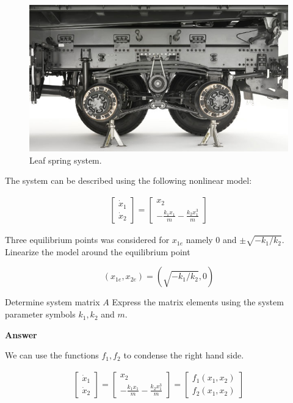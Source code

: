 \begin{figure}[!htb]
\begin{center}
\includegraphics[scale=0.280]{img/state_feedback/Image_LeafSpringSuspension_01.jpg}
\end{center}
\caption{Leaf spring system.}
\label{Image_LeafSpringSuspension_01}
\end{figure}

The system can be described using the following nonlinear model: 

\begin{eqnarray}
\begin{bmatrix}
 \dot{x}_1\\
 \dot{x}_2
\end{bmatrix}= 
\begin{bmatrix}
 x_2  \\
 -\frac{k_1 x_1}{m} - \frac{k_2 x_{1}^3}{m}  
\end{bmatrix} \nonumber
\end{eqnarray}

Three equilibrium points was considered for $x_{1e}$ namely $0$ and $\pm \sqrt{-k_1/k_2}$. Linearize the model around the equilibrium point

\begin{equation}
(x_{1e}, x_{2e} ) = (\sqrt{-k_1/k_2}, 0) \nonumber
\end{equation}

Determine system matrix $A$ Express the matrix elements using the system parameter symbols $k_1, k_2$ and $m$. 

\textbf{Answer}

We can use the functions $f_1, f_2$ to condense the right hand side. 

\begin{eqnarray}
\begin{bmatrix}
 \dot{x}_1\\
 \dot{x}_2
\end{bmatrix}= 
\begin{bmatrix}
 x_2  \\
 -\frac{k_1 x_1}{m} - \frac{k_2 x_{1}^3}{m}  
\end{bmatrix}=
\begin{bmatrix}
 f_1(x_1, x_2)  \\
 f_2(x_1, x_2)  
\end{bmatrix} \nonumber
\end{eqnarray}

